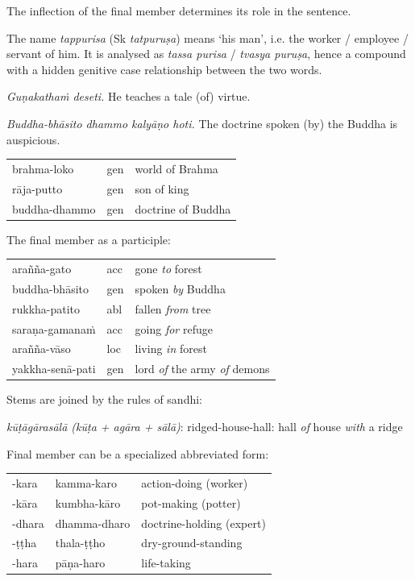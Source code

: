 \documentclass[11pt,oneside]{memoir}
\begin{document}
The inflection of the final member determines its role in the sentence.

The name \emph{tappurisa} (Sk \emph{tatpuruṣa}) means `his man', i.e. the worker /
employee / servant of him. It is analysed as \emph{tassa purisa} / \emph{tvasya puruṣa},
hence a compound with a hidden genitive case relationship between the two words.

\emph{Guṇakathaṁ deseti.} He teaches a tale (of) virtue.

\emph{Buddha-bhāsito dhammo kalyāṇo hoti.} The doctrine spoken (by) the Buddha is auspicious.

\begin{center}
\begin{tabular}{lll}
brahma-loko & gen & world of Brahma\\
rāja-putto & gen & son of king\\
buddha-dhammo & gen & doctrine of Buddha\\
\end{tabular}
\end{center}

The final member as a participle:

\begin{center}
\begin{tabular}{lll}
arañña-gato & acc & gone \emph{to} forest\\
buddha-bhāsito & gen & spoken \emph{by} Buddha\\
rukkha-patito & abl & fallen \emph{from} tree\\
saraṇa-gamanaṁ & acc & going \emph{for} refuge\\
arañña-vāso & loc & living \emph{in} forest\\
yakkha-senā-pati & gen & lord \emph{of} the army \emph{of} demons\\
\end{tabular}
\end{center}

Stems are joined by the rules of sandhi:

\emph{kūṭāgārasālā (kūṭa + agāra + sālā)}: ridged-house-hall: hall \emph{of} house \emph{with} a ridge

Final member can be a specialized abbreviated form:

\begin{center}
\begin{tabular}{lll}
-kara & kamma-karo & action-doing (worker)\\
-kāra & kumbha-kāro & pot-making (potter)\\
-dhara & dhamma-dharo & doctrine-holding (expert)\\
-ṭṭha & thala-ṭṭho & dry-ground-standing\\
-hara & pāṇa-haro & life-taking\\
\end{tabular}
\end{center}
\end{document}
